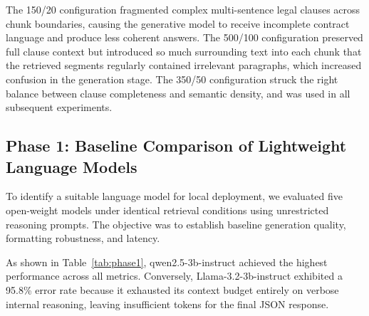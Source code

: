 \documentclass[conference]{IEEEtran}
\begin{document}
The 150/20 configuration fragmented complex multi-sentence legal clauses across chunk boundaries, causing the generative model to receive incomplete contract language and produce less coherent answers. The 500/100 configuration preserved full clause context but introduced so much surrounding text into each chunk that the retrieved segments regularly contained irrelevant paragraphs, which increased confusion in the generation stage. The 350/50 configuration struck the right balance between clause completeness and semantic density, and was used in all subsequent experiments.

\subsection{Phase 1: Baseline Comparison of Lightweight Language Models}
\label{sec:phase1}

To identify a suitable language model for local deployment, we evaluated five open-weight models under identical retrieval conditions using unrestricted reasoning prompts. The objective was to establish baseline generation quality, formatting robustness, and latency.

\begin{table}[!t]
\centering
\caption{Phase 1: Baseline Model Comparison (Unrestricted Reasoning)}
\label{tab:phase1}
\renewcommand{\arraystretch}{1.2}
\end{table}

As shown in Table~\ref{tab:phase1}, qwen2.5-3b-instruct achieved the highest performance across all metrics. Conversely, Llama-3.2-3b-instruct exhibited a 95.8\% error rate because it exhausted its context budget entirely on verbose internal reasoning, leaving insufficient tokens for the final JSON response.
\end{document}
